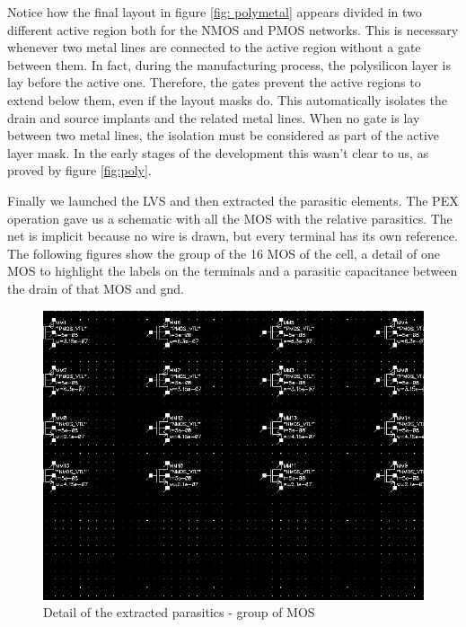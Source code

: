 \documentclass[a4paper]{article}
\begin{document}
Notice how the final layout in figure \ref{fig: polymetal} appears divided in two different active region both for the NMOS and PMOS networks. This is necessary whenever two metal lines are connected to the active region without a gate between them. In fact, during the manufacturing process, the polysilicon layer is lay before the active one. Therefore, the gates prevent the active regions to extend below them, even if the layout masks do. This automatically isolates the drain and source implants and the related metal lines. When no gate is lay between two metal lines, the isolation must be considered as part of the active layer mask. In the early stages of the development this wasn't clear to us, as proved by figure \ref{fig:poly}.

Finally we launched the LVS and then extracted the parasitic elements. The PEX operation gave us a schematic with all the MOS with the relative parasitics. The net is implicit because no wire is drawn, but every terminal has its own reference. The following figures show the group of the 16 MOS of the cell, a detail of one MOS to highlight the labels on the terminals and a parasitic capacitance between the drain of that MOS and gnd. 

\begin{figure}[H]
      \centering
       \includegraphics[width=12cm]{./Images/HA/HAX1_PEX.png}
\caption{Detail of the extracted parasitics - group of MOS}
\label{fig: PEX0}
\end{figure}
\end{document}
